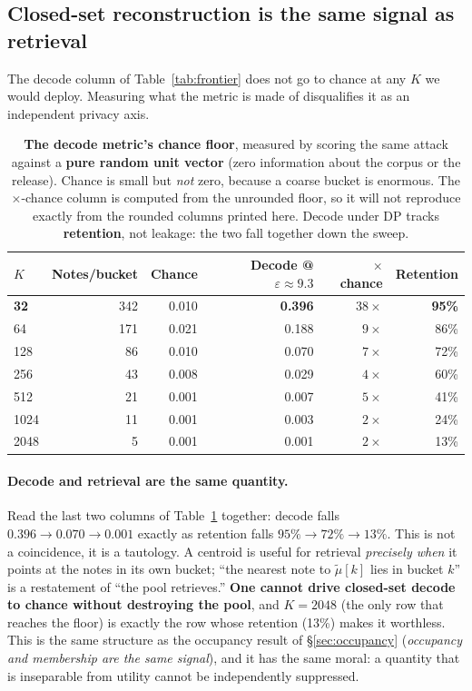 \documentclass[pdflatex,sn-mathphys-num,12pt]{sn-jnl}
\theoremstyle{thmstyleone}%
\theoremstyle{thmstyletwo}%
\theoremstyle{thmstylethree}%
\newcommand{\eps}{\varepsilon}
\newcommand{\secref}[1]{\S\ref{#1}}
\begin{document}
\subsection{Closed-set reconstruction is the same signal as retrieval}\label{sec:decode-floor}

The decode column of Table~\ref{tab:frontier} does not go to chance at any $K$ we would
deploy. Measuring what the metric is made of disqualifies it as an independent privacy axis.

\begin{table}[t]
  \centering
  \caption{\textbf{The decode metric's chance floor}, measured by scoring the same attack
  against a \textbf{pure random unit vector} (zero information about the corpus or the
  release). Chance is small but \emph{not} zero, because a coarse bucket is enormous. The
  $\times$-chance column is computed from the unrounded floor, so it will not reproduce
  exactly from the rounded columns printed here. Decode under DP tracks \textbf{retention},
  not leakage: the two fall together down the sweep.}
  \label{tab:decode-floor}
  \small
  \begin{tabular}{@{}lrrrrr@{}}
    \toprule
    $K$ & Notes/bucket & Chance & Decode @ $\eps \approx 9.3$ & $\times$ chance & Retention \\
    \midrule
    \textbf{32} & 342 & 0.010 & \textbf{0.396} & $38\times$ & \textbf{95\%} \\
    64          & 171 & 0.021 & 0.188 & $9\times$ & 86\% \\
    128         & 86  & 0.010 & 0.070 & $7\times$ & 72\% \\
    256         & 43  & 0.008 & 0.029 & $4\times$ & 60\% \\
    512         & 21  & 0.001 & 0.007 & $5\times$ & 41\% \\
    1024        & 11  & 0.001 & 0.003 & $2\times$ & 24\% \\
    2048        & 5   & 0.001 & 0.001 & $2\times$ & 13\% \\
    \bottomrule
  \end{tabular}
\end{table}

\paragraph{Decode and retrieval are the same quantity.} Read the last two columns of
Table~\ref{tab:decode-floor} together: decode falls $0.396 \to 0.070 \to 0.001$ exactly as
retention falls $95\% \to 72\% \to 13\%$. This is not a coincidence, it is a tautology. A
centroid is useful for retrieval \emph{precisely when} it points at the notes in its own
bucket; ``the nearest note to $\tilde\mu[k]$ lies in bucket $k$'' is a restatement of ``the
pool retrieves.'' \textbf{One cannot drive closed-set decode to chance without destroying the
pool}, and $K = 2048$ (the only row that reaches the floor) is exactly the row whose
retention (13\%) makes it worthless. This is the same structure as the occupancy result of
\secref{sec:occupancy} (\emph{occupancy and membership are the same signal}), and it has the
same moral: a quantity that is inseparable from utility cannot be independently suppressed.
\end{document}
